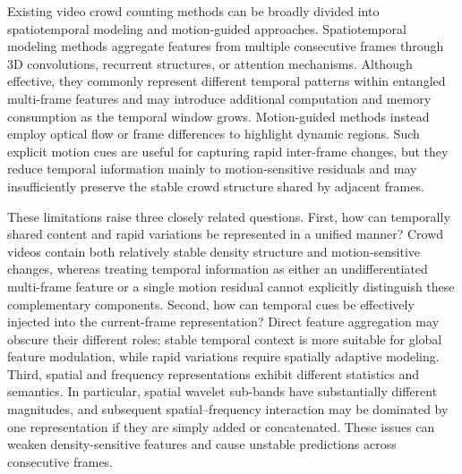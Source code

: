 \documentclass[lettersize,journal]{IEEEtran}
\begin{document}
Existing video crowd counting methods can be broadly divided into spatiotemporal modeling and motion-guided approaches. Spatiotemporal modeling methods \cite{xiong2017spatiotemporal,zou2019enhanced,ma2021spatiotemporal,dong2022clrnet,cai2022global,wu2022spatial,ling2025dual,ling2026dual,ling2026cascaded} aggregate features from multiple consecutive frames through 3D convolutions, recurrent structures, or attention mechanisms. Although effective, they commonly represent different temporal patterns within entangled multi-frame features and may introduce additional computation and memory consumption as the temporal window grows. Motion-guided methods instead employ optical flow \cite{ranjan2017optical,hossain2020video,hou2023frame,cao2024efficient} or frame differences \cite{ling2023motional} to highlight dynamic regions. Such explicit motion cues are useful for capturing rapid inter-frame changes, but they reduce temporal information mainly to motion-sensitive residuals and may insufficiently preserve the stable crowd structure shared by adjacent frames.

These limitations raise three closely related questions. First, how can temporally shared content and rapid variations be represented in a unified manner? Crowd videos contain both relatively stable density structure and motion-sensitive changes, whereas treating temporal information as either an undifferentiated multi-frame feature or a single motion residual cannot explicitly distinguish these complementary components. Second, how can temporal cues be effectively injected into the current-frame representation? Direct feature aggregation may obscure their different roles: stable temporal context is more suitable for global feature modulation, while rapid variations require spatially adaptive modeling. Third, spatial and frequency representations exhibit different statistics and semantics. In particular, spatial wavelet sub-bands have substantially different magnitudes, and subsequent spatial--frequency interaction may be dominated by one representation if they are simply added or concatenated. These issues can weaken density-sensitive features and cause unstable predictions across consecutive frames.
\end{document}
